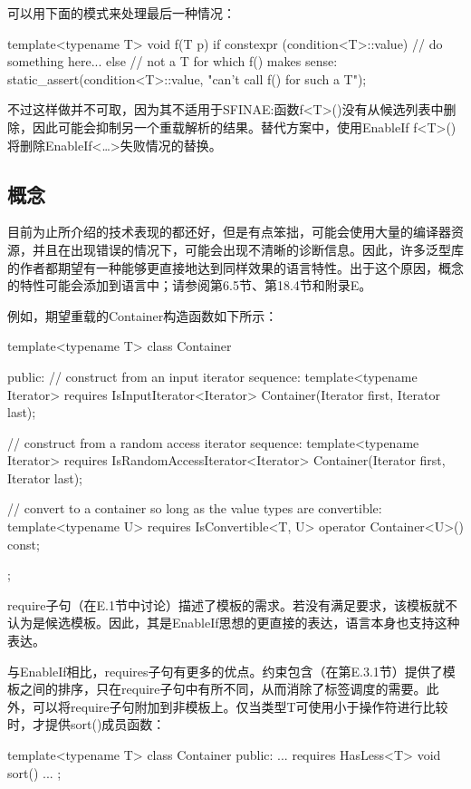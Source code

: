可以用下面的模式来处理最后一种情况：

\begin{cpp}
template<typename T>
void f(T p) {
	if constexpr (condition<T>::value) {
		// do something here...
	}
	else {
		// not a T for which f() makes sense:
		static_assert(condition<T>::value, "can't call f() for such a T");
	}
}
\end{cpp}

不过这样做并不可取，因为其不适用于SFINAE:函数f<T>()没有从候选列表中删除，因此可能会抑制另一个重载解析的结果。替代方案中，使用EnableIf f<T>()将删除EnableIf<…>失败情况的替换。

\subsection{概念}

目前为止所介绍的技术表现的都还好，但是有点笨拙，可能会使用大量的编译器资源，并且在出现错误的情况下，可能会出现不清晰的诊断信息。因此，许多泛型库的作者都期望有一种能够更直接地达到同样效果的语言特性。出于这个原因，概念的特性可能会添加到语言中；请参阅第6.5节、第18.4节和附录E。

例如，期望重载的Container构造函数如下所示：

\begin{cpp}
template<typename T>
class Container {
	public:
	// construct from an input iterator sequence:
	template<typename Iterator>
	requires IsInputIterator<Iterator>
	Container(Iterator first, Iterator last);
	
	// construct from a random access iterator sequence:
	template<typename Iterator>
	requires IsRandomAccessIterator<Iterator>
	Container(Iterator first, Iterator last);
	
	// convert to a container so long as the value types are convertible:
	template<typename U>
	requires IsConvertible<T, U>
	operator Container<U>() const;
};
\end{cpp}

require子句（在E.1节中讨论）描述了模板的需求。若没有满足要求，该模板就不认为是候选模板。因此，其是EnableIf思想的更直接的表达，语言本身也支持这种表达。

与EnableIf相比，requires子句有更多的优点。约束包含（在第E.3.1节）提供了模板之间的排序，只在require子句中有所不同，从而消除了标签调度的需要。此外，可以将require子句附加到非模板上。仅当类型T可使用小于操作符进行比较时，才提供sort()成员函数：

\begin{cpp}
template<typename T>
class Container {
	public:
	...
	requires HasLess<T>
	void sort() {
		...
	}
};
\end{cpp}






